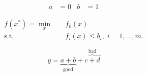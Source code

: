 \documentclass{article}
\begin{document}
\begin{align}
  a &= 0 & b &= 1
\end{align}

\begin{equation}
\begin{aligned}
  f(x^*) = \min_x      & \quad f_0(x) \\
           \text{s.t.} & \quad f_i(x) \leq b_i, \; i = 1, \ldots, m.
\end{aligned}
\end{equation}

\begin{equation}
  y = \underbrace{a + b}_{\text{good}} + \overbrace{c + d}^{\text{bad}}
\end{equation}



% 
\end{document}
